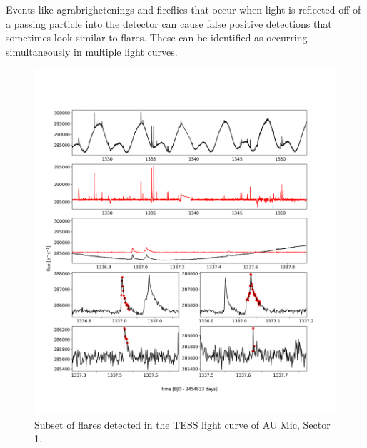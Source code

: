 \documentclass[fleqn,usenatbib,letters]{mnras}%
\begin{document}
Events like agrabrighetenings and fireflies that occur when light is reflected off of a passing particle into the detector can cause false positive detections that sometimes look similar to flares. These can be identified as occurring simultaneously in multiple light curves.


\begin{figure}
\includegraphics[width=\hsize]{figures/aumic_illustrate_flares.png} 
\caption{Subset of flares detected in the TESS light curve of AU Mic, Sector 1.}
\label{fig:illustrate_detrend}
\end{figure}

\end{document}
